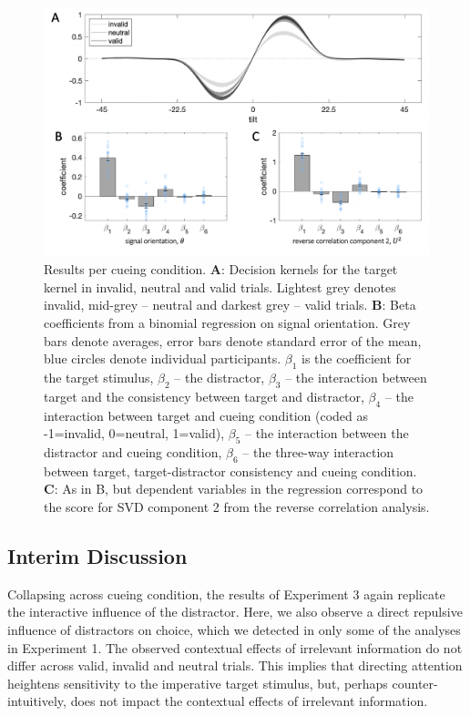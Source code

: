 \documentclass[a4paper, nobind]{templates/ociamthesis}
\begin{document}
\begin{figure}

{\centering \includegraphics[width=1\linewidth]{figures/distr-attention} 

}

\caption[Experiment 3, Results per cueing condition]{Results per cueing condition. $\textbf{A:}$ Decision kernels for the target kernel in invalid, neutral and valid trials. Lightest grey denotes invalid, mid-grey -- neutral and darkest grey -- valid trials. $\textbf{B:}$ Beta coefficients from a binomial regression on signal orientation. Grey bars denote averages, error bars denote standard error of the mean, blue circles denote individual participants. $\beta_1$ is the coefficient for the target stimulus, $\beta_2$ – the distractor, $\beta_3$ – the interaction between target and the consistency between target and distractor, $\beta_4$ – the interaction between target and cueing condition (coded as -1=invalid, 0=neutral, 1=valid), $\beta_5$ – the interaction between the distractor and cueing condition, $\beta_6$ – the three-way interaction between target, target-distractor consistency and cueing condition. $\textbf{C:}$ As in B, but dependent variables in the regression correspond to the score for SVD component 2 from the reverse correlation analysis.}\label{fig:distr-attention}
\end{figure}

\hypertarget{interim-discussion-3}{%
\subsection{Interim Discussion}\label{interim-discussion-3}}

Collapsing across cueing condition, the results of Experiment 3 again replicate the interactive influence of the distractor. Here, we also observe a direct repulsive influence of distractors on choice, which we detected in only some of the analyses in Experiment 1. The observed contextual effects of irrelevant information do not differ across valid, invalid and neutral trials. This implies that directing attention heightens sensitivity to the imperative target stimulus, but, perhaps counter-intuitively, does not impact the contextual effects of irrelevant information.
\end{document}
